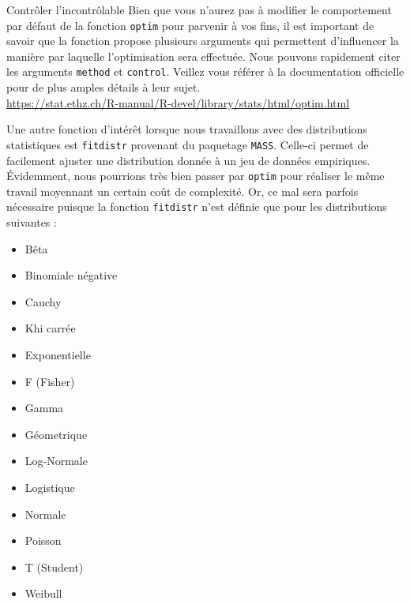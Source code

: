
\begin{moreInfo}{Contrôler l'incontrôlable}
	Bien que vous n'aurez pas à modifier le comportement par défaut de la fonction \texttt{optim} pour parvenir à vos fins, il est important de savoir que la fonction propose plusieurs arguments qui permettent d'influencer la manière par laquelle l'optimisation sera effectuée. Nous pouvons rapidement citer les arguments \texttt{method} et \texttt{control}. Veillez vous référer à la documentation officielle pour de plus amples détails à leur sujet. \\
	\url{https://stat.ethz.ch/R-manual/R-devel/library/stats/html/optim.html}
\end{moreInfo}

Une autre fonction d'intérêt lorsque nous travaillons avec des distributions statistiques est \texttt{fitdistr} provenant du paquetage \texttt{MASS}. Celle-ci permet de facilement ajuster une distribution donnée à un jeu de données empiriques. Évidemment, nous pourrions très bien passer par \texttt{optim} pour réaliser le même travail moyennant un certain coût de complexité. Or, ce mal sera parfois nécessaire puisque la fonction \texttt{fitdistr} n'est définie que pour les distributions suivantes : \cite{MASS}

\begin{minipage}{\linewidth}
	\begin{multicols}{2}
		\begin{itemize}
			\item Bêta
			\item Binomiale négative
			\item Cauchy
			\item Khi carrée
			\item Exponentielle
			\item F (Fisher)
			\item Gamma
			\columnbreak
			\item Géometrique
			\item Log-Normale
			\item Logistique
			\item Normale
			\item Poisson
			\item T (Student)
			\item Weibull
		\end{itemize}
	\end{multicols}
\end{minipage}
\vspace{\baselineskip}

